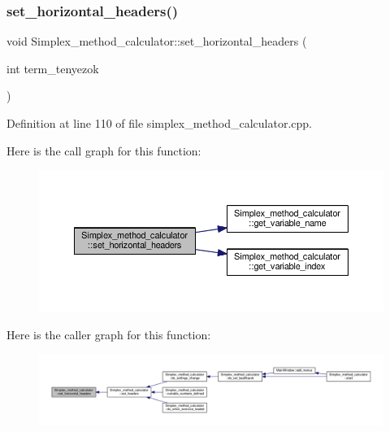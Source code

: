\subsubsection{\texorpdfstring{set\+\_\+horizontal\+\_\+headers()}{set\_horizontal\_headers()}}
{\footnotesize\ttfamily void Simplex\+\_\+method\+\_\+calculator\+::set\+\_\+horizontal\+\_\+headers (\begin{DoxyParamCaption}\item[{int}]{term\+\_\+tenyezok }\end{DoxyParamCaption})\hspace{0.3cm}{\ttfamily [private]}}



Definition at line 110 of file simplex\+\_\+method\+\_\+calculator.\+cpp.

Here is the call graph for this function\+:\nopagebreak
\begin{figure}[H]
\begin{center}
\leavevmode
\includegraphics[width=350pt]{classSimplex__method__calculator_a56de11e5f19d4c81ee0554196834b54e_cgraph}
\end{center}
\end{figure}
Here is the caller graph for this function\+:\nopagebreak
\begin{figure}[H]
\begin{center}
\leavevmode
\includegraphics[width=350pt]{classSimplex__method__calculator_a56de11e5f19d4c81ee0554196834b54e_icgraph}
\end{center}
\end{figure}
\mbox{\label{classSimplex__method__calculator_a7a891278c81b5abf08534e8e977cc5da}} 
